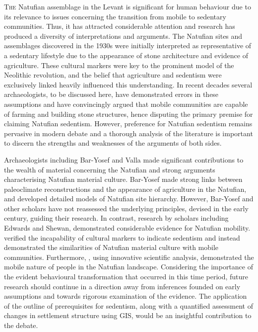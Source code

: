 \documentclass[%
	]{ijsra}
\begin{document}
\IJSRAopening%

\lettrine{T}{he} Natufian assemblage in the Levant is significant for human behaviour due to its relevance to issues concerning the transition from mobile to sedentary communities. Thus, it has attracted considerable attention and research has produced a diversity of interpretations and arguments. 
The Natufian sites and assemblages discovered in the 1930s were initially interpreted as representative of a sedentary lifestyle due to the appearance of stone architecture and evidence of agriculture. These cultural markers were key to the \textcite{Childe_1953} prominent model of the Neolithic revolution, and the belief that agriculture and sedentism were exclusively linked heavily influenced this understanding. In recent decades several archaeologists, to be discussed here, have demonstrated errors in these assumptions and have convincingly argued that mobile communities are capable of farming and building stone structures, hence disputing the primary premise for claiming Natufian sedentism. However, preference for Natufian sedentism remains pervasive in modern debate and a thorough analysis of the literature is important to discern the strengths and weaknesses of the arguments of both sides. 

Archaeologists including Bar-Yosef and Valla made significant contributions to the wealth of material concerning the Natufian and strong arguments characterising Natufian material culture. Bar-Yosef made strong links between paleoclimate reconstructions and the appearance of agriculture in the Natufian, and developed detailed models of Natufian site hierarchy. However, Bar-Yosef and other scholars have not reassessed the underlying principles, devised in the early  century, guiding their research. In contrast, research by scholars including Edwards and Shewan, demonstrated considerable evidence for Natufian mobility. \textcite{Edwards_1989} verified the incapability of cultural markers to indicate sedentism and instead demonstrated the similarities of Natufian material culture with mobile communities. 
Furthermore, \textcite{Shewan_2004}, using innovative scientific analysis, demonstrated the mobile nature of people in the Natufian landscape. 
Considering the importance of the evident behavioural transformation that occurred in this time period, future research should continue in a direction away from inferences founded on early assumptions and towards rigorous examination of the evidence. The application of the \textcite{Fletcher_2007} outline of prerequisites for sedentism, along with a quantified assessment of changes in settlement structure using GIS, would be an insightful contribution to the debate.
\end{document}
